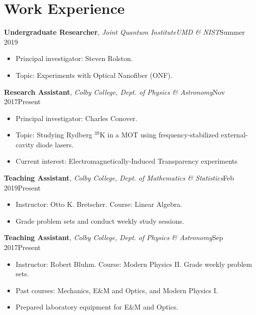 \documentclass[a4paper, 10.5pt]{article}
\begin{document}
	\section*{\normalsize{{\color{colby}\textbf{Work Experience}}}}
	\textbf{Undergraduate Researcher},  \textit{Joint Quantum Institute\textemdash UMD \&  NIST}\hfill Summer 2019
	\begin{itemize}[noitemsep, nolistsep]
		\setlength{\itemindent}{0.2in}
		\item Principal investigator: Steven Rolston.
		\item Topic: Experiments with Optical Nanofiber (ONF). \\
	\end{itemize}
	\indent \indent \textbf{Research Assistant}, \textit{Colby College, Dept. of Physics \& Astronomy}\hfill Nov 2017\textemdash Present
	\begin{itemize}[noitemsep, nolistsep]
		\setlength{\itemindent}{0.2in}
		\item Principal investigator: Charles Conover.
		\item Topic: Studying Rydberg $^{\text{39}}$K in a MOT using frequency-stabilized external-cavity diode lasers.
		\item Current interest: Electromagnetically-Induced Transparency experiments
	\end{itemize}	
	\indent \indent \textbf{Teaching Assistant}, \textit{Colby College, Dept. of Mathematics \& Statistics}\hfill Feb 2019\textemdash Present 
	\begin{itemize}[noitemsep, nolistsep]
		\setlength{\itemindent}{0.2in}
		\item Instructor: Otto K. Bretscher. Course: Linear Algebra.
		\item Grade problem sets and conduct weekly study sessions. \\
	\end{itemize}
	\indent \indent \textbf{Teaching Assistant}, \textit{Colby College, Dept. of Physics \& Astronomy}\hfill Sep 2017\textemdash Present
	\begin{itemize}[noitemsep, nolistsep]
		\setlength{\itemindent}{0.2in}
		\item Instructor: Robert Bluhm. Course: Modern Physics II. Grade weekly problem sets.
		\item Past courses: Mechanics, E\&M and Optics, and Modern Physics I.
		\item Prepared laboratory equipment for E\&M and Optics.\\
	\end{itemize}
\end{document}
